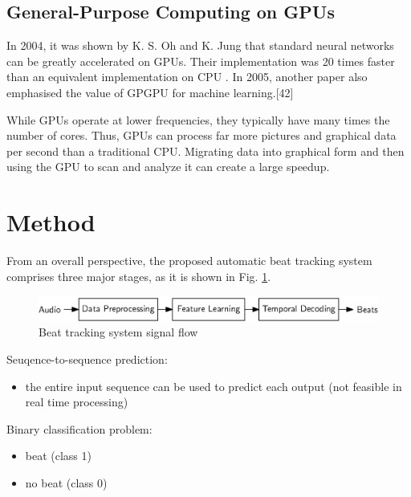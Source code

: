 \documentclass{scrartcl}
\begin{document}
\subsection{General-Purpose Computing on GPUs} 

In 2004, it was shown by K. S. Oh and K. Jung that standard neural networks can be greatly accelerated on GPUs. Their implementation was 20 times faster than an equivalent implementation on CPU \cite{Oh2004}. In 2005, another paper also emphasised the value of GPGPU for machine learning.[42]


While GPUs operate at lower frequencies, they typically have many times the number of cores. Thus, GPUs can process far more pictures and graphical data per second than a traditional CPU. Migrating data into graphical form and then using the GPU to scan and analyze it can create a large speedup.


\newpage


\section{Method}

From an overall perspective, the proposed automatic beat tracking system comprises three major stages, as it is shown in Fig. \ref{fig:system}. 

\begin{figure}[htbp]
\centering
\includegraphics[scale=1.0]{figures/beat_tracking_system.eps}
\caption{Beat tracking system signal flow}
\label{fig:system}
\end{figure}  


Seuqence-to-sequence prediction:
\begin{itemize}
\item the entire input sequence can be used to predict each output (not feasible in real time processing)
\end{itemize}

Binary classification problem:
\begin{itemize}
\item beat (class 1)
\item no beat (class 0)
\end{itemize}
\end{document}
